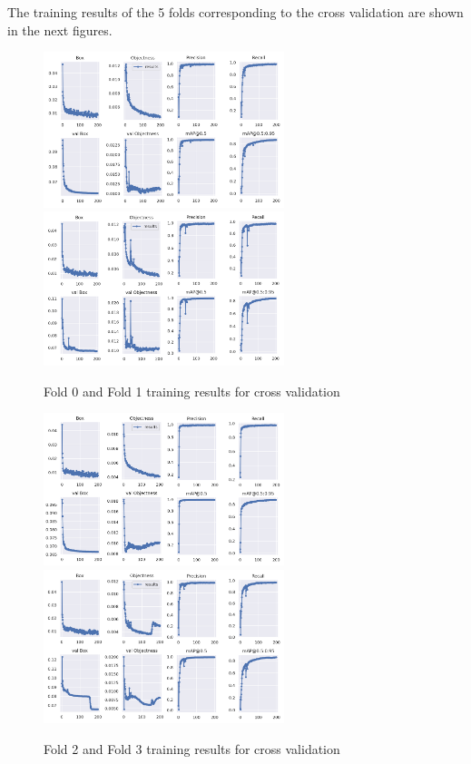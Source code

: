 The training results of the 5 folds corresponding to the cross validation are shown in the next figures.
\begin{figure}[H]
    \centering
    {{\includegraphics[width=7cm]{images/training/cross/00.png} }}
    \qquad
  {{\includegraphics[width=7cm]{images/training/cross/01.png} }}
    \caption{Fold 0 and Fold 1 training results for cross validation}
\end{figure}

\begin{figure}[H]
    \centering
    {{\includegraphics[width=7cm]{images/training/cross/02.png} }}
    \qquad
  {{\includegraphics[width=7cm]{images/training/cross/03.png} }}
    \caption{Fold 2 and Fold 3 training results for cross validation}
\end{figure}

